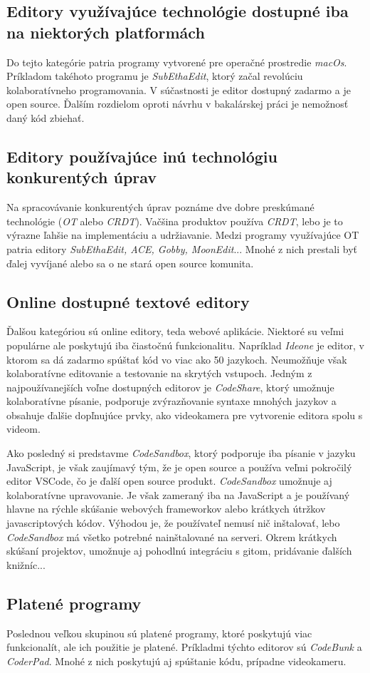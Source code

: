 \subsection{Editory využívajúce technológie dostupné iba na niektorých platformách}
Do tejto kategórie patria programy vytvorené pre operačné prostredie \textit{macOs}.
Príkladom takéhoto programu je \textit{SubEthaEdit}, ktorý začal revolúciu kolaboratívneho 
programovania. V súčastnosti je editor dostupný zadarmo a je open source. Ďalším rozdielom oproti
návrhu v bakalárskej práci je nemožnosť daný kód zbiehať.

\subsection{Editory používajúce inú technológiu konkurentých úprav}
Na spracovávanie konkurentých úprav poznáme dve dobre preskúmané technológie (\textit{OT} alebo
\textit{CRDT}). Vačšina produktov používa \textit{CRDT}, lebo je to výrazne ľahšie na implementáciu
a udržiavanie. Medzi programy využívajúce OT patria editory \textit{SubEthaEdit, ACE, Gobby,
MoonEdit}... Mnohé z nich prestali byť ďalej vyvíjané alebo sa o ne stará open source komunita.

\subsection{Online dostupné textové editory}
Ďalšou kategóriou sú online editory, teda webové aplikácie. Niektoré su veľmi populárne
ale poskytujú iba čiastočnú funkcionalitu. Napríklad \textit{Ideone} je editor, v ktorom
sa dá zadarmo spúštať kód vo viac ako 50 jazykoch. Neumožňuje však kolaboratívne editovanie
a testovanie na skrytých vstupoch.
Jedným z najpoužívanejších voľne dostupných editorov je \textit{CodeShare}, ktorý umožnuje
kolaboratívne písanie, podporuje zvýrazňovanie syntaxe mnohých jazykov a obsahuje ďalšie 
dopľnujúce prvky, ako videokamera pre vytvorenie editora spolu s videom.

Ako posledný si predstavme \textit{CodeSandbox}, ktorý podporuje iba písanie v jazyku JavaScript, je 
však zaujímavý tým, že je open source a používa veľmi pokročilý editor VSCode, čo je ďalší open
source produkt. \textit{CodeSandbox} umožnuje aj kolaboratívne upravovanie. Je však zameraný iba
na JavaScript a je používaný hlavne na rýchle skúšanie webových frameworkov alebo krátkych
útržkov javascriptových kódov. Výhodou je, že používateľ nemusí nič inštalovať, lebo 
\textit{CodeSandbox} má všetko potrebné nainštalované na serveri. Okrem krátkych skúšaní projektov,
umožnuje aj pohodlnú integráciu s gitom, pridávanie ďalších knižníc...

\subsection{Platené programy}
Poslednou veľkou skupinou sú platené programy, ktoré poskytujú viac funkcionalít, ale ich použitie
je platené. Príkladmi týchto editorov sú \textit{CodeBunk} a \textit{CoderPad}. Mnohé z nich
poskytujú aj spúštanie kódu, prípadne videokameru.
